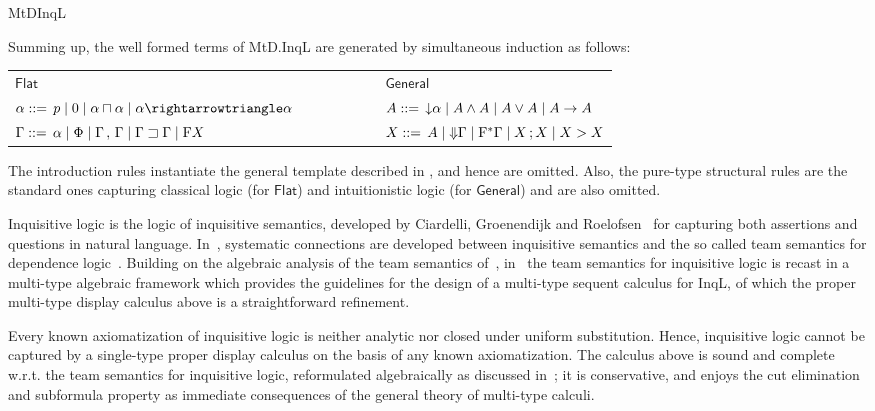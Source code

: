 \begin{entry}{MtDInqL}
\begin{clarifications}
  Summing up, the well formed terms of MtD.InqL are generated by simultaneous
  induction as follows:
  \begin{center}
  \setlength{\tabcolsep}{0.4em}
  \begin{tabular}{lcl}
  $\mathsf{Flat}$ & \ \ \ \ \ \ \ \ \ & $\mathsf{General}$\\
  $\alpha ::= \,p \mid 0 \mid \alpha \cand \alpha \mid \alpha \cra \alpha$ & 
    & $A ::= \,{\downarrow} \alpha \mid A \wedge A \mid A \vee A \mid A \to A$ \\
  $\Gamma ::= \,\alpha \mid \Phi \mid \Gamma \,,\, \Gamma \mid \Gamma \sqsupset \Gamma\mid \mathrm{F} X$ & 
    & $X ::= \,A\mid{\Downarrow} \Gamma\mid \mathrm{F}^*\Gamma \mid X \,; X \mid X > X$ \\
  \end{tabular}
  \end{center}
  
  The introduction rules instantiate the general template described in
  , and hence are omitted. Also, the pure-type structural rules are the
  standard ones capturing classical logic (for $\mathsf{Flat}$) and intuitionistic
  logic (for $\mathsf{General}$) and are also omitted. 
\end{clarifications}


\begin{history}
  Inquisitive logic is the logic of inquisitive semantics, developed by Ciardelli,
  Groenendijk and Roelofsen~\cite{GroenendijkRoelofsen2009,CiardelliRoelofsen2011}
  for capturing both assertions and questions in natural language.
  In~\cite{Yang2014}, systematic connections are developed between inquisitive
  semantics and the so called team semantics for dependence
  logic~\cite{AbramskyVaananen2009}. Building on the algebraic analysis of the
  team semantics of~\cite{AbramskyVaananen2009},
  in~\cite{FrittellaGrecoPalmigianoYang2016}  the team semantics for inquisitive
  logic is recast in a multi-type algebraic framework which provides the
  guidelines for the design of a multi-type sequent calculus for InqL, of which
  the proper multi-type display calculus  above is a straightforward refinement.
\end{history}

\begin{technicalities}
  Every known axiomatization of inquisitive logic is neither analytic nor closed
  under uniform substitution. Hence, inquisitive logic cannot be captured by a
  single-type proper display calculus on the basis of any known axiomatization.
  The calculus above is sound and complete w.r.t. the team semantics for
  inquisitive logic, reformulated algebraically as discussed
  in~\cite{FrittellaGrecoPalmigianoYang2016}; it is conservative, and enjoys the
  cut elimination and subformula property as immediate consequences of the general
  theory of multi-type calculi.
\end{technicalities}

\end{entry}
